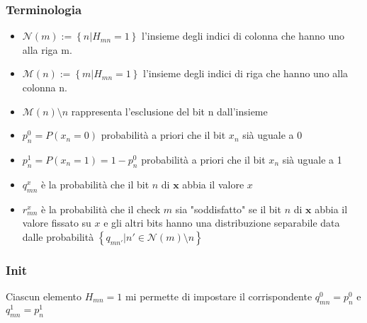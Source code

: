 \documentclass{article}
\begin{document}
	\subsubsection{Terminologia}
	\begin{itemize}
		\item $\mathcal{N}(m) := \left\{ n | H_{mn} = 1 \right\}$ l'insieme degli indici di colonna che hanno uno alla riga m.
		\item $\mathcal{M}(n) := \left\{ m | H_{mn} = 1 \right\}$ l'insieme degli indici di riga che hanno uno alla colonna n.
		\item $\mathcal{M}(n)\setminus n$ rappresenta l'esclusione del bit n dall'insieme
		\item $p_n^0 = P(x_n=0)$ probabilità a priori che il bit $x_n$ sià uguale a 0
		\item $p_n^1 = P(x_n=1)=1-p_n^0$ probabilità a priori che il bit $x_n$ sià uguale a 1
		\item $q^x_{mn}$ è la probabilità che il bit $n$ di $\textbf{x}$ abbia il valore $x$
		\item $r^x_{mn}$ è la probabilità che il check $m$ sia "soddisfatto" se il bit $n$ di $\textbf{x}$ abbia il valore fissato su $x$ e gli altri bits hanno una distribuzione separabile data dalle probabilità $\left\{ q_{mn'} | n' \in \mathcal{N}(m)\setminus n\right\}$
	\end{itemize}
	\subsubsection{Init}
	Ciascun elemento $H_{mn} = 1$ mi permette di impostare il corrispondente $q^0_{mn} = p^0_n$ e $q^1_{mn} = p^1_n$
\end{document}
